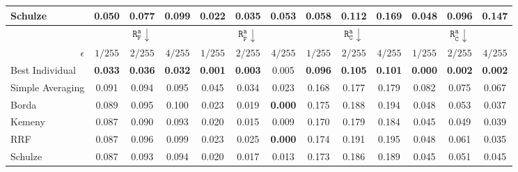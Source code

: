 \begin{table}[!ht]
\begin{tabular}{|l||c|c|c||c|c|c||c|c|c||c|c|c|}
Schulze & 0.050 & 0.077 & 0.099 & 0.022 & 0.035 & 0.053 & 0.058 & 0.112 & 0.169 & 0.048 & 0.096 & 0.147 \\
\hline
\hline
& \multicolumn{3}{c||}{$\mathtt{R}_{\mathtt{F}}^{\mathtt{a}}\downarrow$} & \multicolumn{3}{c||}{$\mathtt{R}_{\bar{\mathtt{F}}}^{\mathtt{a}}\downarrow$} & \multicolumn{3}{c||}{$\mathtt{R}_{\mathtt{C}}^{\mathtt{a}}\downarrow$} & \multicolumn{3}{c|}{$\mathtt{R}_{\bar{\mathtt{C}}}^{\mathtt{a}}\downarrow$} \\
\cline{2-13}
\multicolumn{1}{|r||}{$\epsilon$} & $1/255$ & $2/255$ & $4/255$ & $1/255$ & $2/255$ & $4/255$ & $1/255$ & $2/255$ & $4/255$ & $1/255$ & $2/255$ & $4/255$ \\
\hline
\hline
Best Individual & \textbf{0.033} & \textbf{0.036} & \textbf{0.032} & \textbf{0.001} & \textbf{0.003} & 0.005 & \textbf{0.096} & \textbf{0.105} & \textbf{0.101} & \textbf{0.000} & \textbf{0.002} & \textbf{0.002} \\
\hline
Simple Averaging & 0.091 & 0.094 & 0.095 & 0.045 & 0.034 & 0.023 & 0.168 & 0.177 & 0.179 & 0.082 & 0.075 & 0.067 \\
\hline
Borda & 0.089 & 0.095 & 0.100 & 0.023 & 0.019 & \textbf{0.000} & 0.175 & 0.188 & 0.194 & 0.048 & 0.053 & 0.037 \\
Kemeny & 0.087 & 0.090 & 0.093 & 0.020 & 0.015 & 0.009 & 0.170 & 0.179 & 0.184 & 0.045 & 0.049 & 0.039 \\
RRF & 0.087 & 0.096 & 0.099 & 0.023 & 0.025 & \textbf{0.000} & 0.174 & 0.191 & 0.195 & 0.048 & 0.061 & 0.035 \\
Schulze & 0.087 & 0.093 & 0.094 & 0.020 & 0.017 & 0.013 & 0.173 & 0.186 & 0.189 & 0.045 & 0.051 & 0.045 \\
\hline
\hline
\end{tabular}
\end{table}
